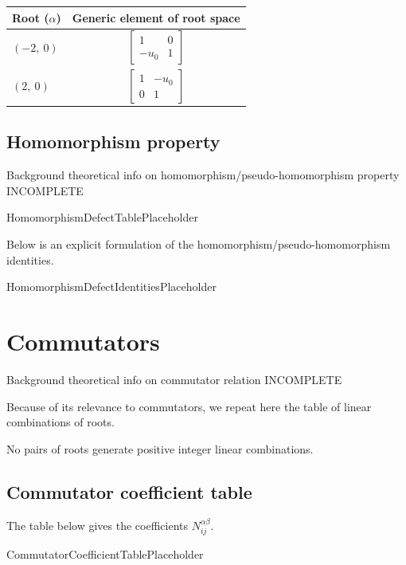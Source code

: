 \documentclass[11pt]{article}
\newcommand{\noi}{\noindent}
\theoremstyle{definition}
\begin{document}
\bigskip

\noindent \begin{tabular}{|l|c|}
    \hline
    \textbf{Root ($\alpha$)} & \textbf{Generic element of root space} \\
    \hline
    $\left( -2, \  0\right)$ & $\left[\begin{matrix}1 & 0\\- u_{0} & 1\end{matrix}\right]$ \\
    \hline
    $\left( 2, \  0\right)$ & $\left[\begin{matrix}1 & - u_{0}\\0 & 1\end{matrix}\right]$ \\
    \hline
\end{tabular}


\subsection{Homomorphism property}

\noi Background theoretical info on homomorphism/pseudo-homomorphism property INCOMPLETE

\bigskip

HomomorphismDefectTablePlaceholder

\noi Below is an explicit formulation of the homomorphism/pseudo-homomorphism identities.

\bigskip

HomomorphismDefectIdentitiesPlaceholder

\newpage
\section{Commutators}

\noi Background theoretical info on commutator relation INCOMPLETE

\noi Because of its relevance to commutators, we repeat here the table of linear combinations of roots.

\noindent No pairs of roots generate positive integer linear combinations.


\subsection{Commutator coefficient table}

\noi The table below gives the coefficients $N_{ij}^{\alpha\beta}$.

CommutatorCoefficientTablePlaceholder
\end{document}
